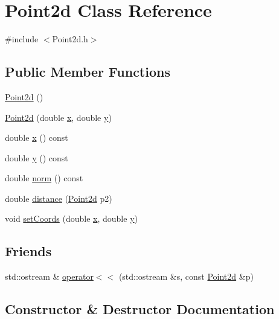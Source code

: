 \hypertarget{class_point2d}{}\section{Point2d Class Reference}
\label{class_point2d}


{\ttfamily \#include $<$Point2d.\+h$>$}

\subsection*{Public Member Functions}
\begin{DoxyCompactItemize}
\item 
\hyperlink{class_point2d_a7fdac7939d9bde8b239cec645fc50c86}{Point2d} ()
\item 
\hyperlink{class_point2d_a102255af27ab69a9194b2c5e91087bb5}{Point2d} (double \hyperlink{class_point2d_ae9ebef830d57fb7c1f198284f6b6bd82}{x}, double \hyperlink{class_point2d_ad6a141e4b4612b3b2ce83e6f00f4ea26}{y})
\item 
double \hyperlink{class_point2d_ae9ebef830d57fb7c1f198284f6b6bd82}{x} () const
\item 
double \hyperlink{class_point2d_ad6a141e4b4612b3b2ce83e6f00f4ea26}{y} () const
\item 
double \hyperlink{class_point2d_ac1663e897d11ca6f479106b3d8154c83}{norm} () const
\item 
double \hyperlink{class_point2d_a848f2370ad60ab7bc77dd2b7d2e93c6e}{distance} (\hyperlink{class_point2d}{Point2d} p2)
\item 
void \hyperlink{class_point2d_a1437edf04ae16b4fb9869d0ae85f7988}{set\+Coords} (double \hyperlink{class_point2d_ae9ebef830d57fb7c1f198284f6b6bd82}{x}, double \hyperlink{class_point2d_ad6a141e4b4612b3b2ce83e6f00f4ea26}{y})
\end{DoxyCompactItemize}
\subsection*{Friends}
\begin{DoxyCompactItemize}
\item 
std\+::ostream \& \hyperlink{class_point2d_a366fa3756254cd9da337c606d8ce1b10}{operator$<$$<$} (std\+::ostream \&s, const \hyperlink{class_point2d}{Point2d} \&p)
\end{DoxyCompactItemize}


\subsection{Constructor \& Destructor Documentation}
\mbox{\label{class_point2d_a7fdac7939d9bde8b239cec645fc50c86}} 

